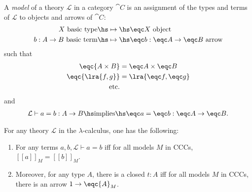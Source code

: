 \documentclass{article}
\begin{document}
\begin{definition}[Awodey p. 139]
    A \emph{model} of a theory $\mathcal{L}$ in a category $\cat C$
    is an assignment of the types and terms of $\mathcal{L}$ to objects
    and arrows of $\cat C$:
    \begin{align*}
        X\text{ basic type} \hs
        &\mapsto\hs\eqc X \text{ object} \\
        b:A\to B\text{ basic term} \hs
        &\mapsto\hs \eqc b: \eqc A \to \eqc B\text{ arrow}
    \end{align*}
    such that 
    \begin{align*}
        \eqc{A\times B} &= \eqc A \times \eqc B \\
        \eqc{\lra{f,g}} &= \lra{\eqc f, \eqc g}\\
        \text{etc.}
    \end{align*}
    and
    \begin{align*}
        \mathcal{L}\vdash a = b : A \to B \hs\text{implies}\hs
        \eqc a = \eqc b : \eqc A \to \eqc B.
    \end{align*}
\end{definition}

\begin{proposition}
    For any theory $\mathcal{L}$ in the $\lambda$-calculus, one has the
    following:
    \begin{enumerate}
        \item For any terms $a,b,\mathcal{L}\vdash a = b$ iff
            for all models $M$ in CCCs, $[\![a]\!]_M=[\![b]\!]_M$.
        \item Moreover, for any type $A$, there is a closed $t:A$ iff for all models $M$ in CCCs, there is an arrow $1\to\eqc{A}_M$. 
    \end{enumerate}
\end{proposition}
\end{document}
